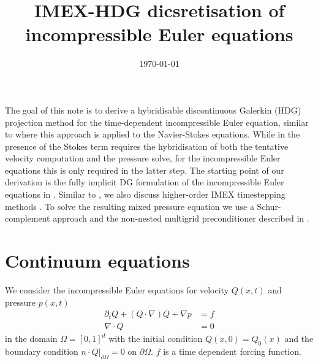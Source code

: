\documentclass[11pt]{article}
\title{IMEX-HDG dicsretisation of incompressible Euler equations}
\date{\today}
\begin{document}
\maketitle
The goal of this note is to derive a hybridisable discontinuous Galerkin (HDG) projection method \cite{Chorin1968} for the time-dependent incompressible Euler equation, similar to \cite{Ueckermann2016} where this approach is applied to the Navier-Stokes equations. While in \cite{Ueckermann2016} the presence of the Stokes term requires the hybridisation of both the tentative velocity computation and the pressure solve, for the incompressible Euler equations this is only required in the latter step. The starting point of our derivation is the fully implicit DG formulation of the incompressible Euler equations in \cite{Guzman2016}. Similar to \cite{Ueckermann2016}, we also discuss higher-order IMEX timestepping methods \cite{Ascher1997}. To solve the resulting mixed pressure equation we use a Schur-complement approach and the non-nested multigrid preconditioner described in \cite{Cockburn2014}.
\section{Continuum equations}
We consider the incompressible Euler equations for velocity $Q(x,t)$ and pressure $p(x,t)$
\begin{equation}
    \begin{aligned}
        \partial_t Q + (Q\cdot \nabla) Q + \nabla p & = f \\
        \nabla\cdot Q                               & = 0
    \end{aligned}\label{eqn:incompressible_euler}
\end{equation}
in the domain $\Omega=[0,1]^d$ with the initial condition $Q(x,0) = Q_0(x)$ and the boundary condition \mbox{$n\cdot Q\vert_{\partial \Omega}=0$} on $\partial\Omega$. $f$ is a time dependent forcing function.
\end{document}
